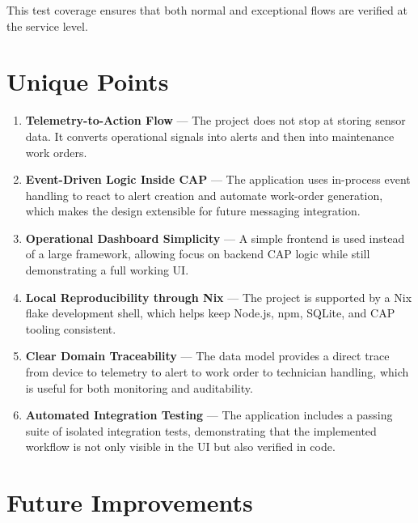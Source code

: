 \documentclass[a4paper,12pt]{article}
\begin{document}
This test coverage ensures that both normal and exceptional flows are verified at the service level.

\section{Unique Points}

\begin{enumerate}[leftmargin=1.8em, itemsep=5pt]
  \item \textbf{Telemetry-to-Action Flow} --- The project does not stop at storing sensor data. It converts operational signals into alerts and then into maintenance work orders.

  \item \textbf{Event-Driven Logic Inside CAP} --- The application uses in-process event handling to react to alert creation and automate work-order generation, which makes the design extensible for future messaging integration.

  \item \textbf{Operational Dashboard Simplicity} --- A simple frontend is used instead of a large framework, allowing focus on backend CAP logic while still demonstrating a full working UI.

  \item \textbf{Local Reproducibility through Nix} --- The project is supported by a Nix flake development shell, which helps keep Node.js, npm, SQLite, and CAP tooling consistent.

  \item \textbf{Clear Domain Traceability} --- The data model provides a direct trace from device to telemetry to alert to work order to technician handling, which is useful for both monitoring and auditability.

  \item \textbf{Automated Integration Testing} --- The application includes a passing suite of isolated integration tests, demonstrating that the implemented workflow is not only visible in the UI but also verified in code.
\end{enumerate}

\section{Future Improvements}
\end{document}
